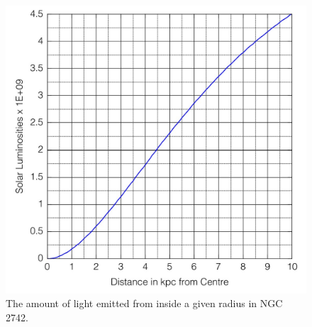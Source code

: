 \documentclass[11pt]{article}%
\begin{document}
\begin{figure}[h!]
\center
\includegraphics[scale=0.6]{Images/light curve 2742.jpg}
\caption{The amount of light emitted from inside a given radius in NGC 2742.}
\label{fig:luminosity}
\end{figure}
\end{document}
